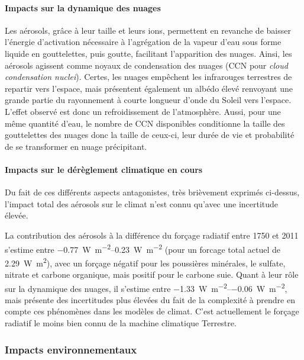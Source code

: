 \paragraph{Impacts sur la dynamique des nuages}%
\label{par:noyaux_de_condensation_des_nuages}

Les aérosols, grâce à leur taille et leurs ions, permettent en revanche de baisser
l'énergie d'activation nécessaire à l'agrégation de la vapeur d'eau sous forme liquide en
gouttelettes, puis goutte, facilitant l'apparition des nuages. Ainsi, les aérosols agissent
comme noyaux de condensation des nuages (CCN pour \textit{cloud condensation nuclei}).
Certes, les nuages empêchent les infrarouges terrestres de repartir vers l'espace, mais
présentent également un albédo élevé renvoyant une grande partie du rayonnement à courte
longueur d'onde du Soleil vers l'espace. L'effet observé est donc un refroidissement de
l'atmosphère.
Aussi, pour une même quantité d'eau, le nombre de CCN disponibles conditionne la taille des
gouttelettes des nuages donc la taille de ceux-ci, leur durée de vie et probabilité de se
transformer en nuage précipitant.

\paragraph{Impacts sur le dérèglement climatique en cours}%
\label{par:impacts_sur_le_dereglement_climatique_en_cours}

Du fait de ces différents aspects antagonistes, très brièvement exprimés ci-dessus,
l'impact total des aérosols sur le climat n'est connu qu'avec une incertitude élevée. 

La contribution des aérosols à la différence du forçage radiatif entre 1750 et 2011 s'estime entre
\SIrange[range-phrase=~et~]{-0.77}{0.23}{\W\per\m\squared} (pour un forcage total actuel
de \SI{2.29}{\W\m\squared}), avec un forçage négatif pour
les poussières minérales, le sulfate, nitrate et carbone organique, mais positif pour le
carbone suie.  Quant à leur rôle sur la dynamique des nuages, il s'estime entre
\SIrange[range-phrase=~et~]{-1.33}{-0.06}{\W\per\m\squared}, mais présente des
incertitudes plus élevées du fait de la complexité à prendre en compte ces phénomènes dans
les modèles de climat. C'est actuellement le forçage radiatif le moins bien connu de la
machine climatique Terrestre.

\subsubsection{Impacts environnementaux}%
\label{ssub:impacts_environnementaux}

